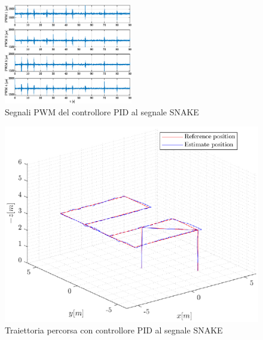 \begin{figure}
	\centering
	\includegraphics[width=0.5\textwidth]{Simulazioni/Figure/PID/SNAKE/PWM}
	\caption{Segnali PWM del controllore PID al segnale SNAKE}
	\label{fig:SNAKEPWMPID}
\end{figure}
\begin{figure}
	\centering
	\includegraphics[width=1\textwidth]{Simulazioni/Figure/PID/SNAKE/Trajectory}
	\caption{Traiettoria percorsa con controllore PID al segnale SNAKE}
	\label{fig:SNAKEtraPID}
\end{figure}

